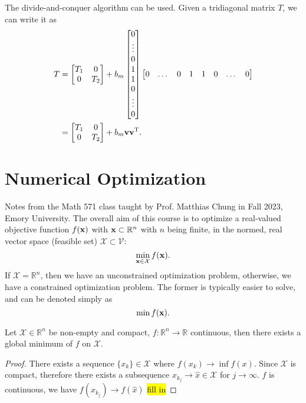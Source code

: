 \documentclass{article}
\begin{document}
The divide-and-conquer algorithm can be used. Given a tridiagonal matrix $T$, we can write it as 
\begin{align}
    T&=\begin{bmatrix}{T_1}&{0}\\{0}&{T_2}\end{bmatrix}+b_m\begin{bmatrix}
        0\\\vdots\\0\\1\\1\\0\\\vdots\\0
    \end{bmatrix}
    \begin{bmatrix}
        0&\dots&0&1&1&0&\dots&0
    \end{bmatrix}\\
    &=\begin{bmatrix}{T_1}&{0}\\{0}&{T_2}\end{bmatrix}+b_m\bm{\mathrm{v}}\bm{\mathrm{v}}^{\text{T}}.
\end{align}

\section{Numerical Optimization}
Notes from the Math 571 class taught by Prof. Matthias Chung in Fall 2023, Emory University. The overall aim of this course is to optimize a real-valued objective function $f(\bm{\mathrm{x}})$ with $\bm{\mathrm{x}}\subset\mathbb{R}^{n}$ with $n$ being finite, in the normed, real vector space (feasible set) $\mathcal{X}\subset\mathcal{V}$:
\begin{equation}
    \min_{\bm{\mathrm{x}}\in\mathcal{X}}f(\bm{\mathrm{x}}).
\end{equation}
If $\mathcal{X}=\mathbb{R}^n$, then we have an unconstrained optimization problem, otherwise, we have a constrained optimization problem. The former is typically easier to solve, and can be denoted simply as 
\begin{equation}
    \min f(\bm{\mathrm{x}}).
\end{equation}

\begin{theorem}
    Let $\mathcal{X}\in\mathbb{R}^n$ be non-empty and compact, $f:\mathbb{R}^n\rightarrow\mathbb{R}$ continuous, then there exists a global minimum of $f$ on $\mathcal{X}$.
\end{theorem}
\begin{proof}
    There exists a sequence $\{x_k\} \in \mathcal{X}$ where $f(x_k)\rightarrow\inf f(x)$. Since $\mathcal{X}$ is compact, therefore there exists a subsequence $x_{k_j}\rightarrow\hat{x}\in\mathcal{X}$ for $j\rightarrow\infty$. $f$ is continuous, we have $f(x_{k_j})\rightarrow f(\hat{x})$ \hl{fill in}
\end{proof}
\end{document}
